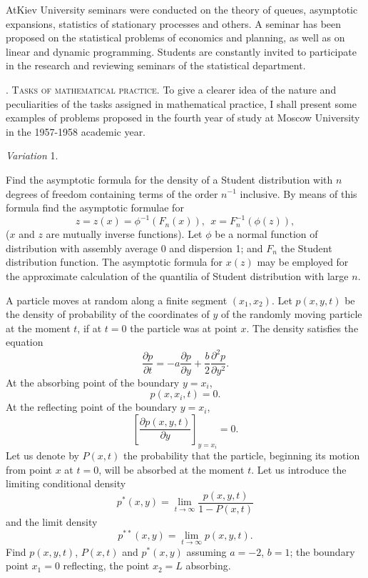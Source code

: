 At\pageoriginale Kiev University seminars were conducted on the theory
of queues, asymptotic expansions, statistics of stationary processes
and others. A seminar has been proposed on the statistical problems of
economics and planning, as well as on linear and dynamic
programming. Students are constantly invited to participate in the
research and reviewing seminars of the statistical department. 

\bigskip
{}. \textsc{Tasks of mathematical practice.} To give a clearer idea of
the nature and peculiarities of the tasks assigned in mathematical
practice, I shall present some examples of problems proposed in the
fourth year of study at Moscow University in the 1957-1958 academic
year.

\medskip
\textit{Variation} 1.
\begin{problem}
Find the asymptotic formula for the density of a Student distribution
with $n$ degrees of freedom containing terms of the order $n^{-1}$
inclusive. By means of this formula find the asymptotic formulae for 
$$
z = z (x) = \phi^{-1} (F_n(x)), ~~ x= F^{-1}_n(\phi(z)),
$$
($x$ and $z$ are mutually inverse functions). Let $\phi$ be a normal
function of distribution with assembly average 0 and dispersion 1; and
$F_n$ the Student distribution function. The asymptotic formula for
$x(z)$ may be employed for the approximate calculation of the
quantilia of Student distribution with large $n$.
\end{problem}

\begin{problem}%
A particle moves at random along a finite segment $(x_1, x_2)$. Let
$p(x,y,t)$ be the density of probability of the coordinates of $y$ of
the randomly moving particle at the moment $t$, if at $t =0$ the
particle was at point $x$. The density satisfies the equation
$$
\frac{\partial p}{\partial t} = - a \frac{\partial p}{\partial y} +
\frac{b}{2} \frac{\partial^2 p}{\partial y^2} .
$$
At the absorbing point of the boundary $y = x_i$,
$$
p(x, x_i, t) = 0.
$$
At the reflecting point of the boundary $y = x_i$,
$$
\left[\frac{\partial p (x,y,t)}{\partial y} \right]_{y=x_i} = 0.
$$\pageoriginale
Let us denote by $P(x,t)$ the probability that the particle, beginning
its motion from point $x$ at $t=0$, will be absorbed at the moment
$t$. Let us introduce the limiting conditional density
$$ 
p^\ast (x,y) = \lim\limits_{t \to \infty} \frac{p(x,y,t)}{1 - P (x,t)}
$$
and the limit density
$$
p^{\ast\ast} (x,y) = \lim\limits_{t \to \infty} p (x,y,t) .
$$
Find $p(x,y,t)$, $P(x,t)$ and $p^{\ast} (x,y)$ assuming $a = - 2 $, $b
=1$; the boundary point $x_1 = 0$ reflecting, the point $x_2 = L$
absorbing. 
\end{problem}

